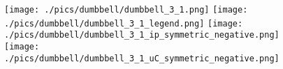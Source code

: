 \documentclass{standalone}
\begin{document}
  \begin{minipage}[t]{\textwidth}

  \begin{figure}
      \centering
      \texttt{[image: ./pics/dumbbell/dumbbell\_3\_1.png]}
      \qquad
      \texttt{[image: ./pics/dumbbell/dumbbell\_3\_1\_legend.png]}
      \vfill
      \texttt{[image: ./pics/dumbbell/dumbbell\_3\_1\_ip\_symmetric\_negative.png]}
      \qquad
      \texttt{[image: ./pics/dumbbell/dumbbell\_3\_1\_uC\_symmetric\_negative.png]}
  \end{figure}

  \end{minipage}
\end{document}
